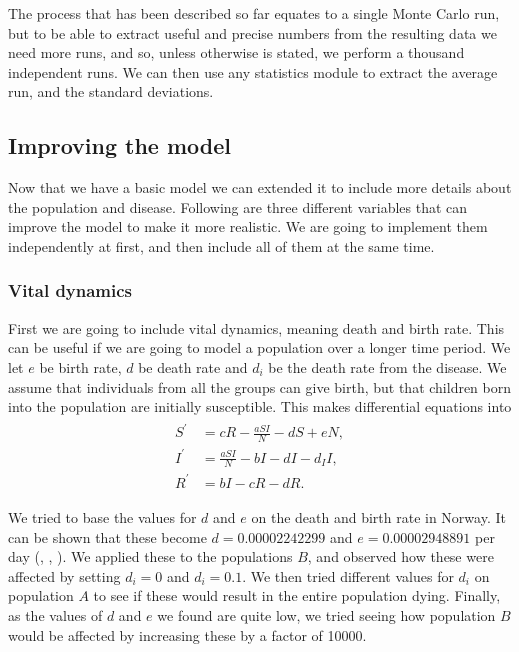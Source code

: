 \documentclass[a4paper]{article}
\let\Oldsubsection\subsection
\renewcommand{\subsection}{\FloatBarrier\Oldsubsection}
\let\Oldsubsubsection\subsubsection
\renewcommand{\subsubsection}{\FloatBarrier\Oldsubsubsection}
\begin{document}
	The process that has been described so far equates to a single Monte Carlo run, but to be able to extract useful and precise numbers from the resulting data we need more runs, and so, unless otherwise is stated, we perform a thousand independent runs. We can then use any statistics module to extract the average run, and the standard deviations.
	\subsection{Improving the model}
	
	Now that we have a basic model we can extended it to include more details about the population and disease. Following are three different variables that can improve the model to make it more realistic. We are going to implement them independently at first, and then include all of them at the same time.
	
	\subsubsection{Vital dynamics}
	
	First we are going to include vital dynamics, meaning death and birth rate. This can be useful if we are going to model a population over a longer time period. We let $e$ be birth rate, $d$ be death rate and $d_i$ be the death rate from the disease. We assume that individuals from all the groups can give birth, but that children born into the population are initially susceptible. This makes differential equations into 
	\begin{align} 
	\begin{split} 
	S ^ { \prime } & = c R - \frac { a S I } { N } - d S + e N, \\ 
	I ^ { \prime } & = \frac { a S I } { N } - b I - d I - d _ { I } I, \\ 
	R ^ { \prime } & = b I - c R - d R.
	\end{split} 
	\end{align}
	
	We tried to base the values for $d$ and $e$ on the death and birth rate in Norway. It can be shown that these become $d=0.00002242299$ and $e=0.00002948891$ per day  (\cite{wiki-d.rate}, \cite{ssb-f.rate}, \cite{wb-bef}). We applied these to the populations $B$, and observed how these were affected by setting $d_i=0$ and $d_i=0.1$. We then tried different values for $d_i$ on population $A$ to see if these would result in the entire population dying. Finally, as the values of $d$ and $e$ we found are quite low, we tried seeing how population $B$ would be affected by increasing these by a factor of
	10000. 
	
\end{document}
